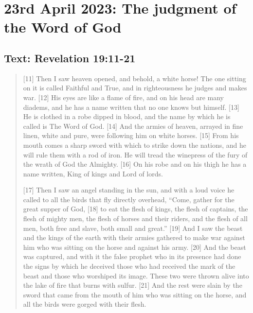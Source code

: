 \setcounter{figure}{0}

\section{23rd April 2023: The judgment of the Word of God}
\subsection*{Text: Revelation 19:11-21}
  \begin{quote}
    [11] Then I saw heaven opened, and behold, a white horse!  The one
    sitting on it is called Faithful and True, and in righteousness he judges
    and makes war.  [12] His eyes are like a flame of fire, and on his head
    are many diadems, and he has a name written that no one knows but
    himself.  [13] He is clothed in a robe dipped in blood, and the name by
    which he is called is The Word of God.  [14] And the armies of heaven,
    arrayed in fine linen, white and pure, were following him on white
    horses.  [15] From his mouth comes a sharp sword with which to strike
    down the nations, and he will rule them with a rod of iron.  He will
    tread the winepress of the fury of the wrath of God the Almighty.  [16]
    On his robe and on his thigh he has a name written, King of kings and
    Lord of lords.

    [17] Then I saw an angel standing in the sun, and with a loud voice he
    called to all the birds that fly directly overhead, “Come, gather for the
    great supper of God, [18] to eat the flesh of kings, the flesh of
    captains, the flesh of mighty men, the flesh of horses and their riders,
    and the flesh of all men, both free and slave, both small and great.”
    [19] And I saw the beast and the kings of the earth with their armies
    gathered to make war against him who was sitting on the horse and against
    his army.  [20] And the beast was captured, and with it the false prophet
    who in its presence had done the signs by which he deceived those who had
    received the mark of the beast and those who worshiped its image.  These
    two were thrown alive into the lake of fire that burns with sulfur.  [21]
    And the rest were slain by the sword that came from the mouth of him who
    was sitting on the horse, and all the birds were gorged with their flesh.
  \end{quote}
